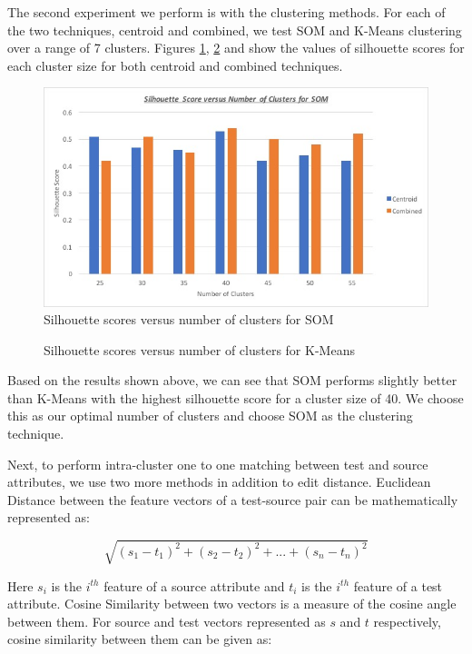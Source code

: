 \documentclass[conference]{IEEEtran}
\begin{document}
The second experiment we perform is with the clustering methods. For each of the two techniques, centroid and combined, we test SOM and K-Means clustering over a range of 7 clusters. Figures \ref{SOM_cluster}, \ref{KMeans_cluster} and show the values of silhouette scores for each cluster size for both centroid and combined techniques. 

\begin{figure}[h]
\includegraphics[scale=0.4]{sc.jpg}
\caption{Silhouette scores versus number of clusters for SOM}
\label{SOM_cluster}
\end{figure}

\begin{figure}[h]
\caption{Silhouette scores versus number of clusters for K-Means}
\label{KMeans_cluster}
\end{figure}

Based on the results shown above, we can see that SOM performs slightly better than K-Means with the highest silhouette score for a cluster size of 40. We choose this as our optimal number of clusters and choose SOM as the clustering technique.

Next, to perform intra-cluster one to one matching between test and source attributes, we use two more methods in addition to edit distance. Euclidean Distance between the feature vectors of a test-source pair can be mathematically represented as:

\begin{equation}
\sqrt{(s_1-t_1)^2 + (s_2-t_2)^2 + ... + (s_n-t_n)^2}
\end{equation}

Here $s_i$ is the $i^{th}$ feature of a source attribute and $t_i$ is the $i^{th}$ feature of a test attribute. Cosine Similarity between two vectors is a measure of the cosine angle between them. For source and test vectors represented as $s$ and $t$ respectively, cosine similarity between them can be given as: 
\end{document}
